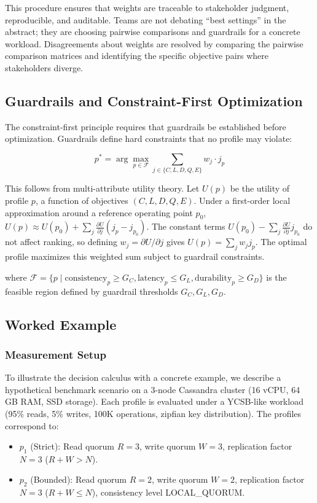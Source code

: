 \documentclass[conference]{IEEEtran}
\begin{document}
This procedure ensures that weights are traceable to stakeholder judgment, reproducible, and auditable. Teams are not debating ``best settings'' in the abstract; they are choosing pairwise comparisons and guardrails for a concrete workload. Disagreements about weights are resolved by comparing the pairwise comparison matrices and identifying the specific objective pairs where stakeholders diverge.

\subsection{Guardrails and Constraint-First Optimization}

The constraint-first principle requires that guardrails be established before optimization. Guardrails define hard constraints that no profile may violate:

\begin{equation}
p^* = \arg\max_{p \in \mathcal{F}} \sum_{j \in \{C,L,D,Q,E\}} w_j \cdot j_p
\end{equation}

This follows from multi-attribute utility theory. Let $U(p)$ be the utility of profile $p$, a function of objectives $(C, L, D, Q, E)$. Under a first-order local approximation around a reference operating point $p_0$, $U(p) \approx U(p_0) + \sum_j \frac{\partial U}{\partial j} (j_p - j_{p_0})$. The constant terms $U(p_0) - \sum_j \frac{\partial U}{\partial j} j_{p_0}$ do not affect ranking, so defining $w_j = \partial U / \partial j$ gives $U(p) = \sum_j w_j j_p$. The optimal profile maximizes this weighted sum subject to guardrail constraints.

where $\mathcal{F} = \{p \mid \text{consistency}_p \geq G_C, \text{latency}_p \leq G_L, \text{durability}_p \geq G_D\}$ is the feasible region defined by guardrail thresholds $G_C, G_L, G_D$.

\subsection{Worked Example}

\subsubsection{Measurement Setup}
To illustrate the decision calculus with a concrete example, we describe a hypothetical benchmark scenario on a 3-node Cassandra cluster (16 vCPU, 64 GB RAM, SSD storage). Each profile is evaluated under a YCSB-like workload (95\% reads, 5\% writes, 100K operations, zipfian key distribution). The profiles correspond to:
\begin{itemize}
    \item $p_1$ (Strict): Read quorum $R=3$, write quorum $W=3$, replication factor $N=3$ ($R+W > N$).
    \item $p_2$ (Bounded): Read quorum $R=2$, write quorum $W=2$, replication factor $N=3$ ($R+W \leq N$), consistency level LOCAL\_QUORUM.
\end{itemize}
\end{document}
